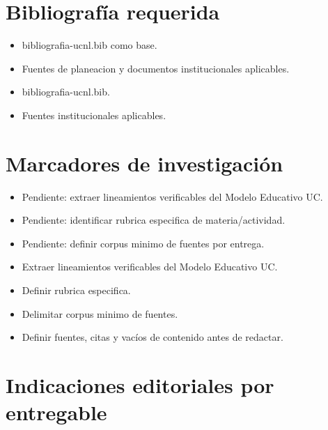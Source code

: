 \documentclass[12pt]{article}
\begin{document}
\section*{Bibliografía requerida}
\begin{itemize}[leftmargin=*]
  \item bibliografia-ucnl.bib como base.
  \item Fuentes de planeacion y documentos institucionales aplicables.
  \item bibliografia-ucnl.bib.
  \item Fuentes institucionales aplicables.
\end{itemize}

\section*{Marcadores de investigación}
\begin{itemize}[leftmargin=*]
  \item Pendiente: extraer lineamientos verificables del Modelo Educativo UC.
  \item Pendiente: identificar rubrica especifica de materia/actividad.
  \item Pendiente: definir corpus minimo de fuentes por entrega.
  \item Extraer lineamientos verificables del Modelo Educativo UC.
  \item Definir rubrica especifica.
  \item Delimitar corpus minimo de fuentes.
  \item Definir fuentes, citas y vacíos de contenido antes de redactar.
\end{itemize}

\section*{Indicaciones editoriales por entregable}
\end{document}
